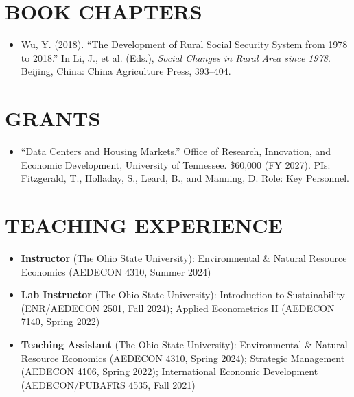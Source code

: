\documentclass[letterpaper,10pt]{article}
\begin{document}
\section{BOOK CHAPTERS}
\begin{itemize}[leftmargin=1em, itemsep=3pt, parsep=0pt, topsep=3pt]
    \item Wu, Y. (2018). ``The Development of Rural Social Security System from 1978 to 2018.'' In Li, J., et al. (Eds.), \textit{Social Changes in Rural Area since 1978}. Beijing, China: China Agriculture Press, 393--404.
\end{itemize}

\section{GRANTS}
\begin{itemize}[leftmargin=1em, itemsep=3pt, parsep=0pt, topsep=3pt]
    \item ``Data Centers and Housing Markets.'' Office of Research, Innovation, and Economic Development, University of Tennessee. \$60,000 (FY 2027). PIs: Fitzgerald, T., Holladay, S., Leard, B., and Manning, D\@. Role: Key Personnel.
\end{itemize}

\section{TEACHING EXPERIENCE}
\begin{itemize}[leftmargin=1em, itemsep=4pt, parsep=0pt, topsep=3pt]
    \item \textbf{Instructor} (The Ohio State University): Environmental \& Natural Resource Economics (AEDECON 4310, Summer 2024)
    \item \textbf{Lab Instructor} (The Ohio State University): Introduction to Sustainability (ENR/AEDECON 2501, Fall 2024); Applied Econometrics II (AEDECON 7140, Spring 2022)
    \item \textbf{Teaching Assistant} (The Ohio State University): Environmental \& Natural Resource Economics (AEDECON 4310, Spring 2024); Strategic Management (AEDECON 4106, Spring 2022); International Economic Development (AEDECON/PUBAFRS 4535, Fall 2021)
\end{itemize}
\end{document}

